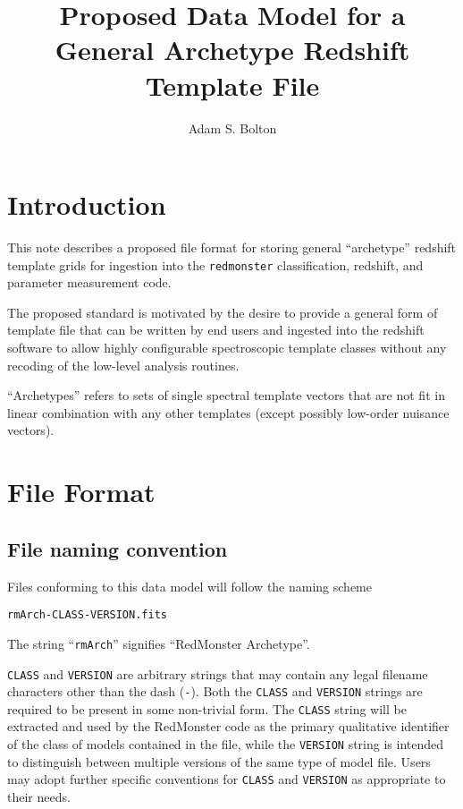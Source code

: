 \documentclass[12pt]{article}
\begin{document}
\title{Proposed Data Model for a General Archetype
Redshift Template File}

\author{Adam S. Bolton}

\maketitle

\section{Introduction}

This note describes a proposed file format for storing general
``archetype'' redshift template grids for ingestion into
the \texttt{redmonster} classification, redshift, and parameter
measurement code.

The proposed standard is motivated by the desire to provide a general
form of template file that can be written by end users and ingested
into the redshift software to allow highly configurable spectroscopic
template classes without any recoding of the low-level analysis routines.

``Archetypes'' refers to sets of single spectral template vectors that are not
fit in linear combination with any other templates (except possibly
low-order nuisance vectors).

\section{File Format}

\subsection{File naming convention}

Files conforming to this data model will follow the naming scheme

\hspace*{36pt}\texttt{rmArch-CLASS-VERSION.fits}

The string ``\texttt{rmArch}'' signifies ``RedMonster Archetype''.

\texttt{CLASS} and \texttt{VERSION} are arbitrary
strings that may contain any legal filename
characters other than the dash (\texttt{-}).  Both the \texttt{CLASS}
and \texttt{VERSION} strings are required to be present in
some non-trivial form.  The \texttt{CLASS} string will be extracted
and used by the RedMonster code as the primary qualitative
identifier of the class of models contained in the file,
while the \texttt{VERSION} string is intended to distinguish
between multiple versions of the same type of model file.
Users may adopt further specific conventions for \texttt{CLASS}
and \texttt{VERSION} as appropriate to their needs.
\end{document}
